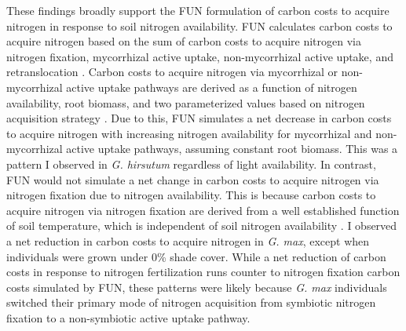 These findings broadly support the FUN formulation of carbon costs to acquire nitrogen in response to soil nitrogen availability. FUN calculates carbon costs to acquire nitrogen based on the sum of carbon costs to acquire nitrogen via nitrogen fixation, mycorrhizal active uptake, non-mycorrhizal active uptake, and retranslocation . Carbon costs to acquire nitrogen via mycorrhizal or non-mycorrhizal active uptake pathways are derived as a function of nitrogen availability, root biomass, and two parameterized values based on nitrogen acquisition strategy . Due to this, FUN simulates a net decrease in carbon costs to acquire nitrogen with increasing nitrogen availability for mycorrhizal and non-mycorrhizal active uptake pathways, assuming constant root biomass. This was a pattern I observed in \textit{G. hirsutum} regardless of light availability. In contrast, FUN would not simulate a net change in carbon costs to acquire nitrogen via nitrogen fixation due to nitrogen availability. This is because carbon costs to acquire nitrogen via nitrogen fixation are derived from a well established function of soil temperature, which is independent of soil nitrogen availability . I observed a net reduction in carbon costs to acquire nitrogen in \textit{G. max}, except when individuals were grown under 0\% shade cover. While a net reduction of carbon costs in response to nitrogen fertilization runs counter to nitrogen fixation carbon costs simulated by FUN, these patterns were likely because \textit{G. max} individuals switched their primary mode of nitrogen acquisition from symbiotic nitrogen fixation to a non-symbiotic active uptake pathway.

